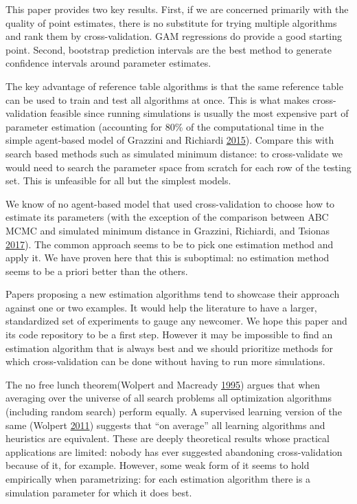 \documentclass[]{article}
\begin{document}
This paper provides two key results.
First, if we are concerned primarily with the quality of point estimates, there is no substitute for trying multiple algorithms and rank them by cross-validation.
GAM regressions do provide a good starting point.
Second, bootstrap prediction intervals are the best method to generate confidence intervals around parameter estimates.

The key advantage of reference table algorithms is that the same reference table can be used to train and test all algorithms at once.
This is what makes cross-validation feasible since running simulations is usually the most expensive part of parameter estimation (accounting for 80\% of the computational time in the simple agent-based model of Grazzini and Richiardi \protect\hyperlink{ref-Grazzini2015}{2015}).
Compare this with search based methods such as simulated minimum distance: to cross-validate we would need to search the parameter space from scratch for each row of the testing set.
This is unfeasible for all but the simplest models.

We know of no agent-based model that used cross-validation to choose how to estimate its parameters (with the exception of the comparison between ABC MCMC and simulated minimum distance in Grazzini, Richiardi, and Tsionas \protect\hyperlink{ref-Grazzini2017}{2017}).
The common approach seems to be to pick one estimation method and apply it.
We have proven here that this is suboptimal: no estimation method seems to be a priori better than the others.

Papers proposing a new estimation algorithms tend to showcase their approach against one or two examples.
It would help the literature to have a larger, standardized set of experiments to gauge any newcomer.
We hope this paper and its code repository to be a first step.
However it may be impossible to find an estimation algorithm that is always best and we should prioritize methods for which cross-validation can be done without having to run more simulations.

The no free lunch theorem(Wolpert and Macready \protect\hyperlink{ref-Wolpert1995}{1995}) argues that when averaging over the universe of all search problems all optimization algorithms (including random search) perform equally.
A supervised learning version of the same (Wolpert \protect\hyperlink{ref-Wolpert2011}{2011}) suggests that ``on average'' all learning algorithms and heuristics are equivalent.
These are deeply theoretical results whose practical applications are limited: nobody has ever suggested abandoning cross-validation because of it, for example.
However, some weak form of it seems to hold empirically when parametrizing: for each estimation algorithm there is a simulation parameter for which it does best.
\end{document}
